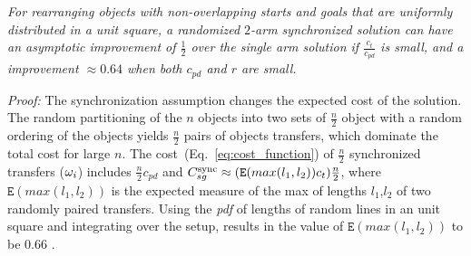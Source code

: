 \begin{theorem}
	\textit{For rearranging objects with non-overlapping starts and goals that are 
	uniformly distributed in a unit square,  a randomized $2$-arm \textit{synchronized} solution can have an 
	asymptotic improvement of $\frac{1}{2}$ over the single arm solution if $\frac{c_t}{c_{pd}}$ is small, and a improvement $\approx 0.64$ when both $c_{pd}$ and $r$ are small. }
\end{theorem}


\textit{Proof:} The synchronization assumption changes the expected cost of the solution. The random partitioning of the $n$ objects into two sets of $\frac{n}{2}$ object with a random ordering of the objects yields $\frac{n}{2}$ pairs of objects transfers, which dominate the total cost for large $n$. The cost~(Eq.~\ref{eq:cost_function}) of $\frac{n}{2}$ synchronized transfers (${\omega}_i$) includes $\frac{n}{2}c_{pd}$ and $C^{\rm sync}_{sg} \approx (\mathtt{E}(max(l_1,l_2))c_t)\frac{n}{2}$, where $\mathtt{E}(max(l_1,l_2))$ is the expected measure of the max of lengths $l_1$,$l_2$ of two randomly paired transfers. Using the \textit{pdf}\cite{ghosh1951random} of lengths of random lines in an unit square and integrating over the setup\cite{Shome2018WAFR}, results in the value of $\mathtt{E}(max(l_1,l_2))$ to be $0.66$ . 



